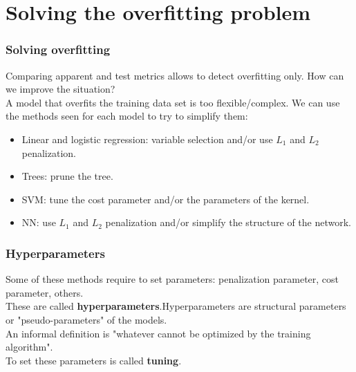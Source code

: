 \section{Solving the overfitting problem}
\begin{frame}
\frametitle{Solving overfitting}
Comparing apparent and test metrics allows to detect overfitting only. How can we improve the situation?\\
\vspace{0.3cm}
A model that overfits the training data set is too flexible/complex. We can use the methods seen for each model to try to simplify them:
\begin{itemize}
\item Linear and logistic regression: variable selection and/or use $L_1$ and $L_2$ penalization.
\item Trees: prune the tree.
\item SVM: tune the cost parameter and/or the parameters of the kernel.
\item NN: use $L_1$ and $L_2$ penalization and/or simplify the structure of the network.
\end{itemize}

\end{frame}
\begin{frame}
\frametitle{Hyperparameters}
Some of these methods require to set parameters: penalization parameter, cost parameter, others.\\ 
\vspace{0.3cm}
These are called {\bf hyperparameters}.Hyperparameters are structural parameters or "pseudo-parameters" of the models.\\
\vspace{0.3cm}
An informal definition is "whatever cannot be optimized by the training algorithm".\\
\vspace{0.3cm}
To set these parameters is called {\bf tuning}.
\end{frame}
